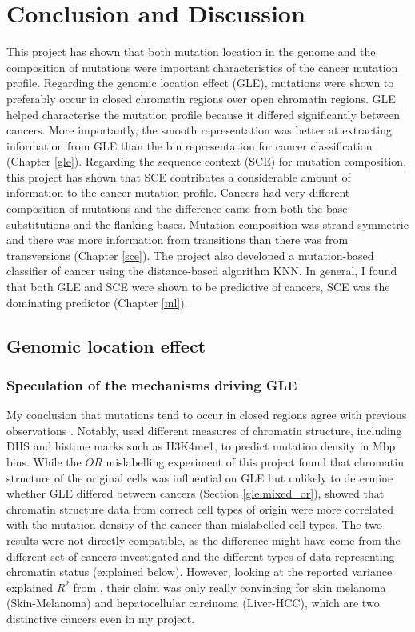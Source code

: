\chapter{Conclusion and Discussion}\label{discussion}

This project has shown that both mutation location in the genome and the composition of mutations were important characteristics of the cancer mutation profile. Regarding the genomic location effect (GLE), mutations were shown to preferably occur in closed chromatin regions over open chromatin regions. GLE helped characterise the mutation profile because it differed significantly between cancers. More importantly, the smooth representation was better at extracting information from GLE than the bin representation for cancer classification (Chapter \ref{gle}). Regarding the sequence context (SCE) for mutation composition, this project has shown that SCE contributes a considerable amount of information to the cancer mutation profile. Cancers had very different composition of mutations and the difference came from both the base substitutions and the flanking bases. Mutation composition was strand-symmetric and there was more information from transitions than there was from transversions (Chapter \ref{sce}). The project also developed a mutation-based classifier of cancer using the distance-based algorithm KNN. In general, I found that both GLE and SCE were shown to be predictive of cancers, SCE was the dominating predictor (Chapter \ref{ml}).

\section{Genomic location effect}
\subsection{Speculation of the mechanisms driving GLE}
My conclusion that mutations tend to occur in closed regions agree with previous observations \citep{Polak2015,Fujimoto2016Whole-genomeCancer,Prendergast2007ChromatinGenome}. Notably, \citet{Polak2015} used different measures of chromatin structure, including DHS and histone marks such as H3K4me1, to predict mutation density in Mbp bins. While the $OR$ mislabelling experiment of this project found that chromatin structure of the original cells was influential on GLE but unlikely to determine whether GLE differed between cancers (Section \ref{gle:mixed_or}), \citet{Polak2015} showed that chromatin structure data from correct cell types of origin were more correlated with the mutation density of the cancer than mislabelled cell types. The two results were not directly compatible, as the difference might have come from the different set of cancers investigated and the different types of data representing chromatin status (explained below). However, looking at the reported variance explained $R^2$ from \citet{Polak2015}, their claim was only really convincing for skin melanoma (Skin-Melanoma) and hepatocellular carcinoma (Liver-HCC), which are two distinctive cancers even in my project. 

